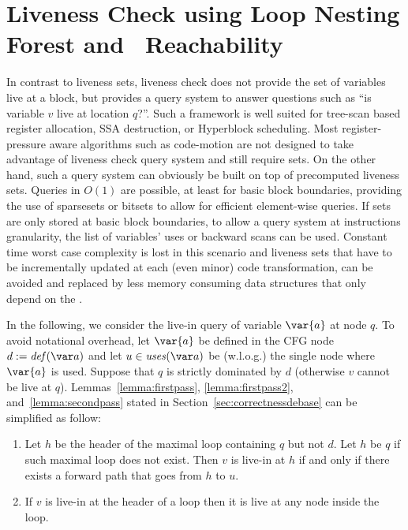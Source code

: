 \section{Liveness Check using Loop Nesting Forest and \Reduced\ Reachability}
\label{sec:live-check}

In contrast to liveness sets, liveness check does not provide the set of variables live at a block, but provides a query system to answer questions such as ``is variable $v$ live at location $q$?''.
Such a framework is well suited for tree-scan based register allocation, SSA destruction, or Hyperblock scheduling.
Most register-pressure aware algorithms such as code-motion are not designed to take advantage of liveness check query system and still require sets.
On the other hand, such a query system can obviously be built on top of precomputed liveness sets.
Queries in $O(1)$ are possible, at least for basic block boundaries, providing the use of sparsesets or bitsets to allow for efficient element-wise queries.
If sets are only stored at basic block boundaries, to allow a query system at instructions granularity, the list of variables' uses or backward scans can be used.
Constant time worst case complexity is lost in this scenario and liveness sets that have to be incrementally updated at each (even minor) code transformation, can be avoided and replaced by less memory consuming data structures that only depend on the \@CFG.

In the following, we consider the live-in query of variable $\var{a}$ at node $q$.
To avoid notational overhead, let $\var{a}$ be defined in the CFG node $d:=\ldef{a}$ and let $u \in \luse{a}$ be (w.l.o.g.) the single node where $\var{a}$ is used.
Suppose that $q$ is strictly dominated by $d$ (otherwise $v$ cannot be live at $q$).
Lemmas~\ref{lemma:firstpass}, \ref{lemma:firstpass2}, and~\ref{lemma:secondpass} stated in Section~\ref{sec:correctnessdebase} can be simplified as follow:
\begin{enumerate}
\item
	Let $h$ be the header of the maximal loop containing $q$ but not $d$.
	Let $h$ be $q$ if such maximal loop does not exist.
	Then $v$ is live-in at $h$ if and only if there exists a forward path that goes from $h$ to $u$.
\item
	If $v$ is live-in at the header of a loop then it is live at any node inside the loop.
\end{enumerate}

